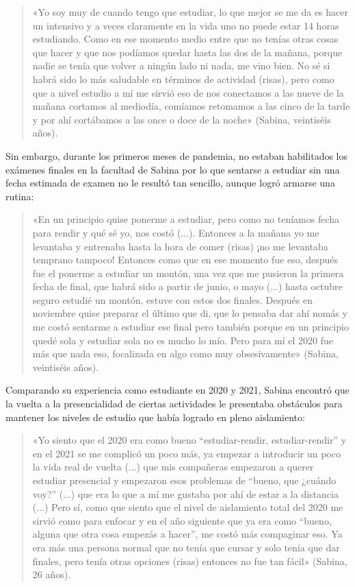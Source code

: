 \begin{quote}
«Yo soy muy de cuando tengo que estudiar, lo que mejor se me da es hacer un intensivo y a veces claramente en la vida uno no puede estar 14 horas estudiando. Como en ese momento medio entre que no tenías otras cosas que hacer y que nos podíamos quedar hasta las dos de la mañana, porque nadie se tenía que volver a ningún lado ni nada, me vino bien. No sé si habrá sido lo más saludable en términos de actividad (risas), pero como que a nivel estudio a mí me sirvió eso de nos conectamos a las nueve de la mañana cortamos al mediodía, comíamos retomamos a las cinco de la tarde y por ahí cortábamos a las once o doce de la noche» (Sabina, veintiséis años).
\end{quote}

Sin embargo, durante los primeros meses de pandemia, no estaban habilitados los exámenes finales en la facultad de Sabina por lo que sentarse a estudiar sin una fecha estimada de examen no le resultó tan sencillo, aunque logró armarse una rutina:

\begin{quote}
«En un principio quise ponerme a estudiar, pero como no teníamos fecha para rendir y qué sé yo, nos costó (...). Entonces a la mañana yo me levantaba y entrenaba hasta la hora de comer (risas) ¡no me levantaba temprano tampoco! Entonces como que en ese momento fue eso, después fue el ponerme a estudiar un montón, una vez que me pusieron la primera fecha de final, que habrá sido a partir de junio, o mayo (...) hasta octubre seguro estudié un montón, estuve con estos dos finales. Después en noviembre quise preparar el último que di, que lo pensaba dar ahí nomás y me costó sentarme a estudiar ese final pero también porque en un principio quedé sola y estudiar sola no es mucho lo mío. Pero para mí el 2020 fue más que nada eso, focalizada en algo como muy obsesivamente» (Sabina, veintiséis años).
\end{quote}

Comparando su experiencia como estudiante en 2020 y 2021, Sabina encontró que la vuelta a la presencialidad de ciertas actividades le presentaba obstáculos para mantener los niveles de estudio que había logrado en pleno aislamiento:

\begin{quote}
«Yo siento que el 2020 era como bueno ``estudiar-rendir, estudiar-rendir'' y en el 2021 se me complicó un poco más, ya empezar a introducir un poco la vida real de vuelta (...) que mis compañeras empezaron a querer estudiar presencial y empezaron esos problemas de ``bueno, que ¿cuándo voy?'' (...) que era lo que a mí me gustaba por ahí de estar a la distancia (...) Pero sí, como que siento que el nivel de aislamiento total del 2020 me sirvió como para enfocar y en el año siguiente que ya era como ``bueno, alguna que otra cosa empezás a hacer'', me costó más compaginar eso. Ya era más una persona normal que no tenía que cursar y solo tenía que dar finales, pero tenía otras opciones (risas) entonces no fue tan fácil» (Sabina, 26 años).
\end{quote}

